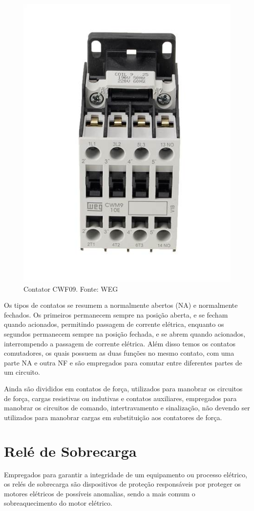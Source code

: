 \documentclass[a4paper, 12pt,oneside, english, brazil]{abntex2}
\begin{document}
\begin{figure}[H]
    \centering
    \includegraphics[scale=1.2]{contator.jpg}
    \caption{Contator CWF09. Fonte: WEG}
    \label{cont}
\end{figure}
Os tipos de contatos se resumem a normalmente abertos (NA) e normalmente fechados. Os primeiros permanecem sempre na posição aberta, e se fecham quando acionados, permitindo passagem de corrente elétrica, enquanto os segundos permanecem sempre na posição fechada, e se abrem quando acionados, interrompendo a passagem de corrente elétrica. Além disso temos os contatos comutadores, os quais possuem as duas funções no mesmo contato, com uma parte NA e outra NF e são empregados para comutar entre diferentes partes de um circuito.

Ainda são divididos em contatos de força, utilizados para manobrar os circuitos de força, cargas resistivas ou indutivas e contatos auxiliares, empregados para manobrar os circuitos de comando, intertravamento e sinalização, não devendo ser utilizados para manobrar cargas em substituição aos contatores de força.

\section{Relé de Sobrecarga}
Empregados para garantir a integridade de um equipamento ou processo elétrico, os relés de sobrecarga são dispositivos de proteção responsáveis por proteger os motores elétricos de possíveis anomalias, sendo a mais comum o sobreaquecimento do motor elétrico. 
\end{document}
